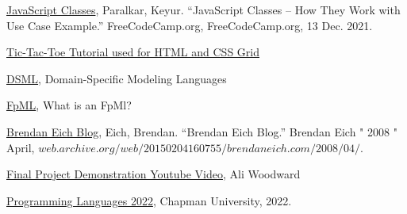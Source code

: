 \documentclass{article}
\theoremstyle{theorem}
\theoremstyle{definition}
\theoremstyle{remark}
\begin{document}
\begin{thebibliography}{99}
\href{https://www.freecodecamp.org/news/javascript-classes-how-they-work-with-use-case/#:~:text=functions%20in%20JS-,What%20are%20classes%20in%20JavaScript%3F,a%20prototype%2Dbased%20inheritance%20model.}{JavaScript Classes}, Paralkar, Keyur. “JavaScript Classes – How They Work with Use Case Example.” FreeCodeCamp.org, FreeCodeCamp.org, 13 Dec. 2021.

\href{https://www.webtips.dev/tic-tac-toe-in-javascript}{Tic-Tac-Toe Tutorial used for HTML and CSS Grid}

\href{https://miuc.org/definition-of-a-domain-specific-modelling-language/}{DSML}, Domain-Specific Modeling Languages

\href{https://www.fpml.org/}{FpML}, What is an FpMl?

\href{https://web.archive.org/web/20150204160755/http://brendaneich.com/2008/04/}{Brendan Eich Blog}, Eich, Brendan. “Brendan Eich Blog.” Brendan Eich " 2008 " April, $web.archive.org/web/20150204160755/brendaneich.com/2008/04/$.

\href{https://youtu.be/yDoLiSOlFX0}{Final Project Demonstration Youtube Video}, Ali Woodward

 \href{https://github.com/alexhkurz/programming-languages-2022/blob/main/README.md}{Programming Languages 2022}, Chapman University, 2022.

\end{thebibliography}
\end{document}
